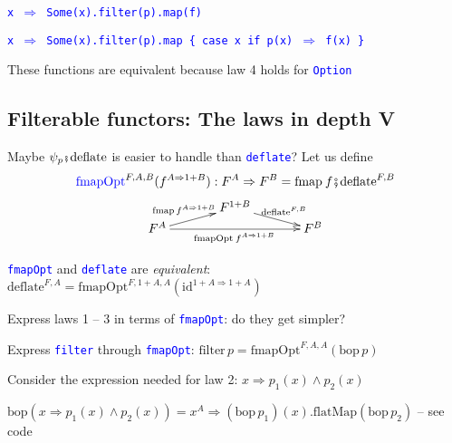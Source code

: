 \texttt{\textcolor{blue}{\footnotesize{}x $\Rightarrow$ Some(x).filter(p).map(f)}}{\footnotesize\par}

\texttt{\textcolor{blue}{\footnotesize{}x $\Rightarrow$ Some(x).filter(p).map
\{ case x if p(x) $\Rightarrow$ f(x) \}}}{\footnotesize\par}

These functions are equivalent because law 4 holds for \texttt{\textcolor{blue}{\footnotesize{}Option}}{\footnotesize\par}


\subsection{Filterable functors: The laws in depth V}

Maybe $\psi_{p}\bef\text{deflate}$ is easier to handle than \texttt{\textcolor{blue}{\footnotesize{}deflate}}?
Let us define {\footnotesize{}
\[
\text{{\color{blue}fmapOpt}}^{F,A,B}(f^{A\Rightarrow1+B}):F^{A}\Rightarrow F^{B}=\text{fmap}\:f\bef\text{deflate}^{F,B}
\]
\[
\xymatrix{\xyScaleY{0.2pc}\xyScaleX{3pc} & F^{1+B}\ar[rd]\sp(0.5){\ \text{deflate}^{F,B}}\\
F^{A}\ar[ru]\sp(0.5){\text{fmap}\,f^{A\Rightarrow1+B}\ }\ar[rr]\sb(0.5){\text{fmapOpt}\:f^{A\Rightarrow1+B}\,} &  & F^{B}
}
\]
}{\footnotesize\par}

\texttt{\textcolor{blue}{\footnotesize{}fmapOpt}} and \texttt{\textcolor{blue}{\footnotesize{}deflate}}
are \emph{equivalent}: {\footnotesize{}$\text{deflate}^{F,A}=\text{fmapOpt}^{F,1+A,A}(\text{id}^{1+A\Rightarrow1+A})$ }{\footnotesize\par}

Express laws 1 – 3 in terms of \texttt{\textcolor{blue}{\footnotesize{}fmapOpt}}:
do they get simpler?

Express \texttt{\textcolor{blue}{\footnotesize{}filter}} through \texttt{\textcolor{blue}{\footnotesize{}fmapOpt}}:
{\footnotesize{}$\text{filter}\,p=\text{fmapOpt}^{F,A,A}\left(\text{bop}\,p\right)$}{\footnotesize\par}

Consider the expression needed for law 2: $x\Rightarrow p_{1}(x)\wedge p_{2}(x)$

{\footnotesize{}$\text{bop}\left(x\Rightarrow p_{1}(x)\wedge p_{2}(x)\right)=x^{A}\Rightarrow\left(\text{bop}\,p_{1}\right)(x)\text{.flatMap}\left(\text{bop}\,p_{2}\right)$
}– see code

